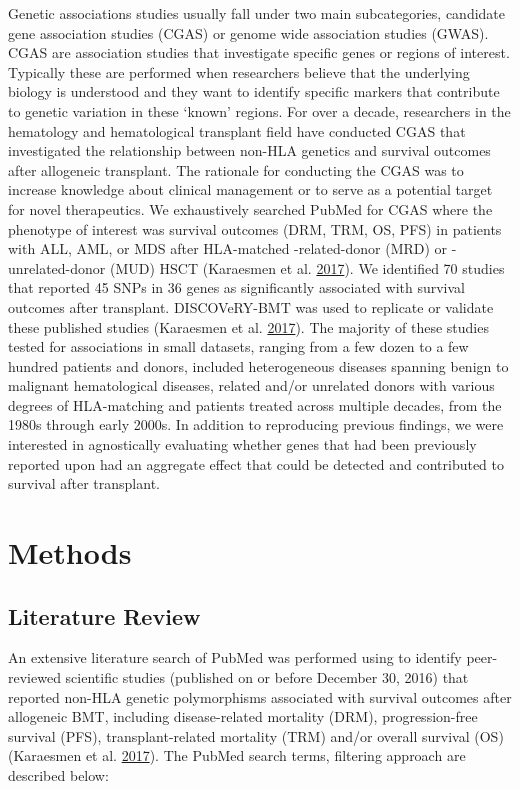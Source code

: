 \documentclass[]{DissertateOSU}
\begin{document}
Genetic associations studies usually fall under two main subcategories,
candidate gene association studies (CGAS) or genome wide association
studies (GWAS). CGAS are association studies that investigate specific
genes or regions of interest. Typically these are performed when
researchers believe that the underlying biology is understood and they
want to identify specific markers that contribute to genetic variation
in these `known' regions. For over a decade, researchers in the
hematology and hematological transplant field have conducted CGAS that
investigated the relationship between non-HLA genetics and survival
outcomes after allogeneic transplant. The rationale for conducting the
CGAS was to increase knowledge about clinical management or to serve as
a potential target for novel therapeutics. We exhaustively searched
PubMed for CGAS where the phenotype of interest was survival outcomes
(DRM, TRM, OS, PFS) in patients with ALL, AML, or MDS after HLA-matched
-related-donor (MRD) or -unrelated-donor (MUD) HSCT (Karaesmen et al.
\protect\hyperlink{ref-Karaesmen_2017}{2017}). We identified 70 studies
that reported 45 SNPs in 36 genes as significantly associated with
survival outcomes after transplant. DISCOVeRY-BMT was used to replicate
or validate these published studies (Karaesmen et al.
\protect\hyperlink{ref-Karaesmen_2017}{2017}). The majority of these
studies tested for associations in small datasets, ranging from a few
dozen to a few hundred patients and donors, included heterogeneous
diseases spanning benign to malignant hematological diseases, related
and/or unrelated donors with various degrees of HLA-matching and
patients treated across multiple decades, from the 1980s through early
2000s. In addition to reproducing previous findings, we were interested
in agnostically evaluating whether genes that had been previously
reported upon had an aggregate effect that could be detected and
contributed to survival after transplant.

\section{Methods}\label{methods}

\subsection{Literature Review}\label{literature-review}

An extensive literature search of PubMed was performed using to identify
peer-reviewed scientific studies (published on or before December 30,
2016) that reported non-HLA genetic polymorphisms associated with
survival outcomes after allogeneic BMT, including disease-related
mortality (DRM), progression-free survival (PFS), transplant-related
mortality (TRM) and/or overall survival (OS) (Karaesmen et al.
\protect\hyperlink{ref-Karaesmen_2017}{2017}). The PubMed search terms,
filtering approach are described below:
\end{document}
